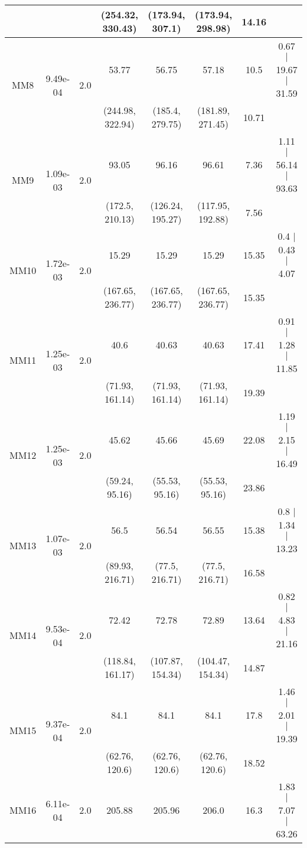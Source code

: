 \begin{longtable}{|c|c|c|c|c|c|c|c|}
	 &  &  & (254.32, 330.43) & (173.94, 307.1) & (173.94, 298.98) & 14.16 & \\
 	\hline
	\multirow{2}{*}{MM8} & \multirow{2}{*}{9.49e-04} & \multirow{2}{*}{2.0} & 53.77 & 56.75 & 57.18 & 10.5 & 0.67 $\mid$ 19.67 $\mid$ 31.59\\
	 &  &  & (244.98, 322.94) & (185.4, 279.75) & (181.89, 271.45) & 10.71 & \\
 	\hline
	\multirow{2}{*}{MM9} & \multirow{2}{*}{1.09e-03} & \multirow{2}{*}{2.0} & 93.05 & 96.16 & 96.61 & 7.36 & 1.11 $\mid$ 56.14 $\mid$ 93.63\\
	 &  &  & (172.5, 210.13) & (126.24, 195.27) & (117.95, 192.88) & 7.56 & \\
 	\hline
	\multirow{2}{*}{MM10} & \multirow{2}{*}{1.72e-03} & \multirow{2}{*}{2.0} & 15.29 & 15.29 & 15.29 & 15.35 & 0.4 $\mid$ 0.43 $\mid$ 4.07\\
	 &  &  & (167.65, 236.77) & (167.65, 236.77) & (167.65, 236.77) & 15.35 & \\
 	\hline
	\multirow{2}{*}{MM11} & \multirow{2}{*}{1.25e-03} & \multirow{2}{*}{2.0} & 40.6 & 40.63 & 40.63 & 17.41 & 0.91 $\mid$ 1.28 $\mid$ 11.85\\
	 &  &  & (71.93, 161.14) & (71.93, 161.14) & (71.93, 161.14) & 19.39 & \\
 	\hline
	\multirow{2}{*}{MM12} & \multirow{2}{*}{1.25e-03} & \multirow{2}{*}{2.0} & 45.62 & 45.66 & 45.69 & 22.08 & 1.19 $\mid$ 2.15 $\mid$ 16.49\\
	 &  &  & (59.24, 95.16) & (55.53, 95.16) & (55.53, 95.16) & 23.86 & \\
 	\hline
	\multirow{2}{*}{MM13} & \multirow{2}{*}{1.07e-03} & \multirow{2}{*}{2.0} & 56.5 & 56.54 & 56.55 & 15.38 & 0.8 $\mid$ 1.34 $\mid$ 13.23\\
	 &  &  & (89.93, 216.71) & (77.5, 216.71) & (77.5, 216.71) & 16.58 & \\
 	\hline
	\multirow{2}{*}{MM14} & \multirow{2}{*}{9.53e-04} & \multirow{2}{*}{2.0} & 72.42 & 72.78 & 72.89 & 13.64 & 0.82 $\mid$ 4.83 $\mid$ 21.16\\
	 &  &  & (118.84, 161.17) & (107.87, 154.34) & (104.47, 154.34) & 14.87 & \\
 	\hline
	\multirow{2}{*}{MM15} & \multirow{2}{*}{9.37e-04} & \multirow{2}{*}{2.0} & 84.1 & 84.1 & 84.1 & 17.8 & 1.46 $\mid$ 2.01 $\mid$ 19.39\\
	 &  &  & (62.76, 120.6) & (62.76, 120.6) & (62.76, 120.6) & 18.52 & \\
 	\hline
	\multirow{2}{*}{MM16} & \multirow{2}{*}{6.11e-04} & \multirow{2}{*}{2.0} & 205.88 & 205.96 & 206.0 & 16.3 & 1.83 $\mid$ 7.07 $\mid$ 63.26\\

\end{longtable}
